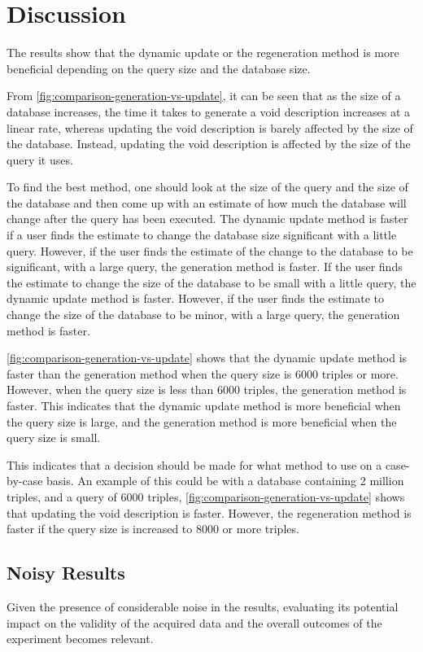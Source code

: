 \section{Discussion}\label{sec:discussion}
The results show that the dynamic update or the regeneration method is more beneficial depending on the query size and the database size.

From \autoref{fig:comparison-generation-vs-update}, it can be seen that as the size of a database increases, the time it takes to generate a \gls{void} description increases at a linear rate, whereas updating the \gls{void} description is barely affected by the size of the database. Instead, updating the \gls{void} description is affected by the size of the query it uses.

To find the best method, one should look at the size of the query and the size of the database and then come up with an estimate of how much the database will change after the query has been executed. The dynamic update method is faster if a user finds the estimate to change the database size significant with a little query. However, if the user finds the estimate of the change to the database to be significant, with a large query, the generation method is faster. If the user finds the estimate to change the size of the database to be small with a little query, the dynamic update method is faster. However, if the user finds the estimate to change the size of the database to be minor, with a large query, the generation method is faster.

\autoref{fig:comparison-generation-vs-update} shows that the dynamic update method is faster than the generation method when the query size is 6000 triples or more. However, when the query size is less than 6000 triples, the generation method is faster. This indicates that the dynamic update method is more beneficial when the query size is large, and the generation method is more beneficial when the query size is small.

This indicates that a decision should be made for what method to use on a case-by-case basis. An example of this could be with a database containing 2 million triples, and a query of 6000 triples, \autoref{fig:comparison-generation-vs-update} shows that updating the \gls{void} description is faster. However, the regeneration method is faster if the query size is increased to 8000 or more triples.

\subsection{Noisy Results}\label{subsec:noisy-results}
Given the presence of considerable noise in the results, evaluating its potential impact on the validity of the acquired data and the overall outcomes of the experiment becomes relevant.

